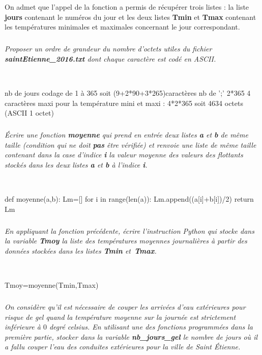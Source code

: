 \documentclass[10pt,fleqn]{article} %
\begin{document}
On admet que l'appel de la fonction a permis de récupérer trois listes : la liste \textbf{jours}
contenant le numéros du jour et  les deux listes \textbf{Tmin} et 
\textbf{Tmax} contenant les températures minimales et maximales concernant le jour 
correspondant.


\subparagraph{} 
\textit{Proposer un ordre de grandeur du nombre d'octets utiles du fichier 
\textbf{saintEtienne\_2016.txt} dont chaque caractère est codé en ASCII.}

\ifprof
\begin{corrige}~\
\begin{python}
nb de jours codage de 1 à 365 soit (9+2*90+3*265)caractères
nb de ';' 2*365
4 caractères maxi pour la température mini et maxi : 4*2*365
soit 4634 octets (ASCII 1 octet)
\end{python}
\end{corrige}
\else
\fi
	
\subparagraph{} 
	\textit{Écrire une fonction \textbf{moyenne} qui prend en entrée deux listes 
	\textbf{a} et \textbf{b} de même taille (condition qui ne doit \textbf{pas} être vérifiée)
	 et renvoie une liste de même taille contenant dans 
	la case d'indice \textbf{i} la valeur moyenne des valeurs des flottants 
	stockés dans les deux listes \textbf{a} et \textbf{b} à l'indice \textbf{i}.}
	
\ifprof
\begin{corrige}~\
\begin{python}
def moyenne(a,b):
    Lm=[]
    for i in range(len(a)):
        Lm.append((a[i]+b[i])/2)
    return Lm
\end{python}
\end{corrige}
\else
\fi
	
\subparagraph{} 
\textit{En appliquant la fonction précédente, écrire l'instruction Python 
	qui stocke dans la variable \textbf{Tmoy} la liste des températures moyennes 
	journalières à partir des données stockées dans les listes \textbf{Tmin} et~\textbf{Tmax}.}
	
\ifprof
\begin{corrige}~\
\begin{python}
Tmoy=moyenne(Tmin,Tmax)
\end{python}
\end{corrige}
\else
\fi

	
\subparagraph{} 
\textit{On considère qu'il est nécessaire de couper les arrivées d'eau 
	extérieures pour risque de gel quand la température moyenne sur la journée 
	est strictement inférieure à $0$ degré celsius. En utilisant une des fonctions 
	programmées dans la première partie, stocker dans la variable 
	\textbf{nb\_jours\_gel} le nombre de jours où il a fallu couper l'eau des 
	conduites extérieures pour la ville de Saint Étienne.}
	
\end{document}
